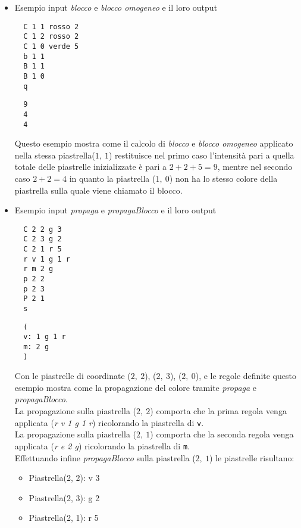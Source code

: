 \documentclass{article}
\begin{document}
\begin{itemize}
  \item  Esempio input \textit{blocco} e \textit{blocco omogeneo} e il loro output\\
  \begin{minipage}[t]{0.45\textwidth}
  \begin{verbatim}
  C 1 1 rosso 2
  C 1 2 rosso 2
  C 1 0 verde 5
  b 1 1
  B 1 1
  B 1 0
  q
  \end{verbatim}
  \end{minipage}
  \hfill
  \begin{minipage}[t]{0.45\textwidth}
  \begin{verbatim}
  9
  4
  4
  \end{verbatim}
  \end{minipage}
  Questo esempio mostra come il calcolo di \textit{blocco} e \textit{blocco omogeneo} applicato nella stessa piastrella(\(1,\ 1\)) restituisce nel primo caso l'intensità pari a quella totale delle piastrelle inizializzate è pari a \(2+2+5 = 9\), mentre nel secondo caso \(2+2 = 4\) in quanto la piastrella (\(1,\ 0\)) non ha lo stesso colore della piastrella sulla quale viene chiamato il blocco.\\

  \item  Esempio input \textit{propaga} e \textit{propagaBlocco} e il loro output\\
  \begin{minipage}[t]{0.45\textwidth}
  \begin{verbatim}
  C 2 2 g 3
  C 2 3 g 2
  C 2 1 r 5
  r v 1 g 1 r
  r m 2 g
  p 2 2
  p 2 3
  P 2 1
  s
  \end{verbatim}
  \end{minipage}
  \hfill
  \begin{minipage}[t]{0.45\textwidth}
  \begin{verbatim}
  (
  v: 1 g 1 r
  m: 2 g
  )
  \end{verbatim}
  \end{minipage}
  Con le piastrelle di coordinate (\(2,\ 2\)), (\(2,\ 3\)), (\(2,\ 0\)), e le regole definite questo esempio mostra come la propagazione del colore tramite \textit{propaga} e \textit{propagaBlocco}.\\ 
  La propagazione sulla piastrella (\(2,\ 2\)) comporta che la prima regola venga applicata (\textit{r v 1 g 1 r}) ricolorando la piastrella di \texttt{v}.\\
  La propagazione sulla piastrella (\(2,\ 1\)) comporta che la seconda regola venga applicata (\textit{r e 2 g}) ricolorando la piastrella di \texttt{m}.\\
  Effettuando infine \textit{propagaBlocco} sulla piastrella (\(2,\ 1\)) le piastrelle risultano:\\
  \begin{itemize}
    \item Piastrella(2, 2): v 3
    \item Piastrella(2, 3): g 2
    \item Piastrella(2, 1): r 5
  \end{itemize}


\end{itemize}
\end{document}
